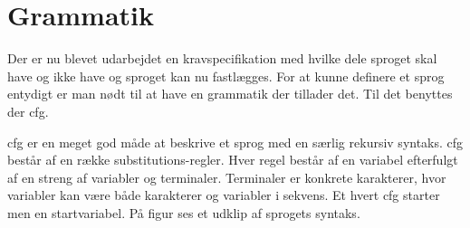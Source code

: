\section{Grammatik}\label{sec:Gramatik}

Der er nu blevet udarbejdet en kravspecifikation med hvilke dele sproget skal have og ikke have og sproget kan nu fastlægges. For at kunne definere et sprog entydigt er man nødt til at have en grammatik der tillader det. Til det benyttes der \gls{cfg}.

\gls{cfg} er en meget god måde at beskrive et sprog med en særlig rekursiv syntaks. \gls{cfg} består af en række substitutions-regler. Hver regel består af en variabel efterfulgt af en streng af variabler og terminaler. Terminaler er konkrete karakterer, hvor variabler kan være både karakterer og variabler i sekvens. Et hvert \gls{cfg} starter men en startvariabel. På figur  ses et udklip af sprogets syntaks.

